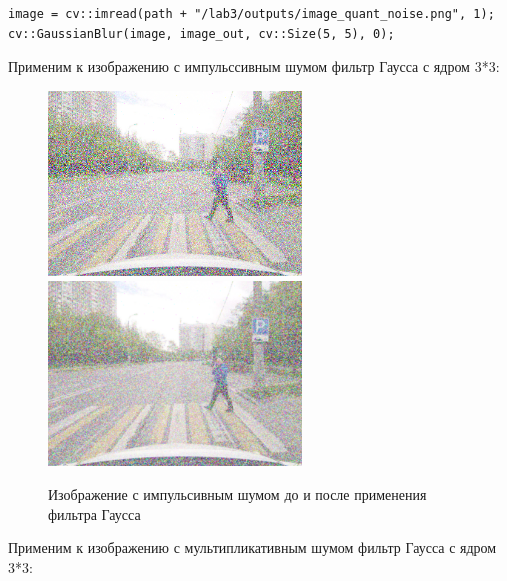 \begin{lstlisting}[style=cpp_white, caption={Исходный код фильра Гаусса}]
image = cv::imread(path + "/lab3/outputs/image_quant_noise.png", 1);
cv::GaussianBlur(image, image_out, cv::Size(5, 5), 0);
\end{lstlisting}

Применим к изображению с импульссивным шумом фильтр Гаусса с ядром 3*3:

\begin{figure}[hbt!]
    \centering
    \includegraphics[width=0.6\textwidth]{../outputs/image_impulse_noise.png}
    \includegraphics[width=0.6\textwidth]{../outputs/image_impulse_filter.png}
    \caption{Изображение с импульсивным шумом до и после применения фильтра Гаусса}
    \label{fig:stich_images}
\end{figure}

Применим к изображению с мультипликативным шумом фильтр Гаусса с ядром 3*3:

